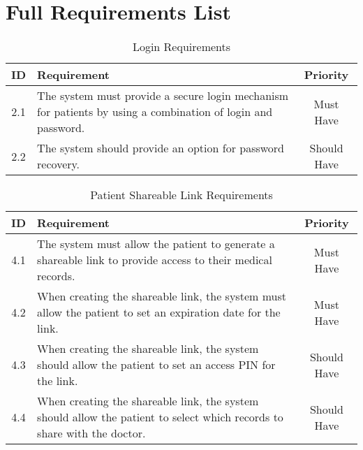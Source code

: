 \appendix

\chapter{Full Requirements List}\label{sec:requirements}

\begin{table}[htbp]
    \centering
    \begin{tabular}{|c|p{10cm}|c|}
    \hline
    \textbf{ID}  & \textbf{Requirement}  & \textbf{Priority} \\ \hline
    2.1  & The system must provide a secure login mechanism for patients by using a combination of login and password. & Must Have \\ \hline
    2.2 & The system should provide an option for password recovery. & Should Have \\ \hline
    \end{tabular}
    \caption{Login Requirements}
\end{table}
    
\begin{table}[htbp]
    \centering
    \begin{tabular}{|c|p{10cm}|c|}
    \hline
    \textbf{ID}  & \textbf{Requirement}  & \textbf{Priority} \\ \hline
    4.1  & The system must allow the patient to generate a shareable link to provide access to their medical records. & Must Have \\ \hline
    4.2  & When creating the shareable link, the system must allow the patient to set an expiration date for the link. & Must Have \\ \hline
    4.3  & When creating the shareable link, the system should allow the patient to set an access PIN for the link. & Should Have \\ \hline
    4.4  & When creating the shareable link, the system should allow the patient to select which records to share with the doctor. & Should Have \\ \hline
    \end{tabular}
    \caption{Patient Shareable Link Requirements}
\end{table}

